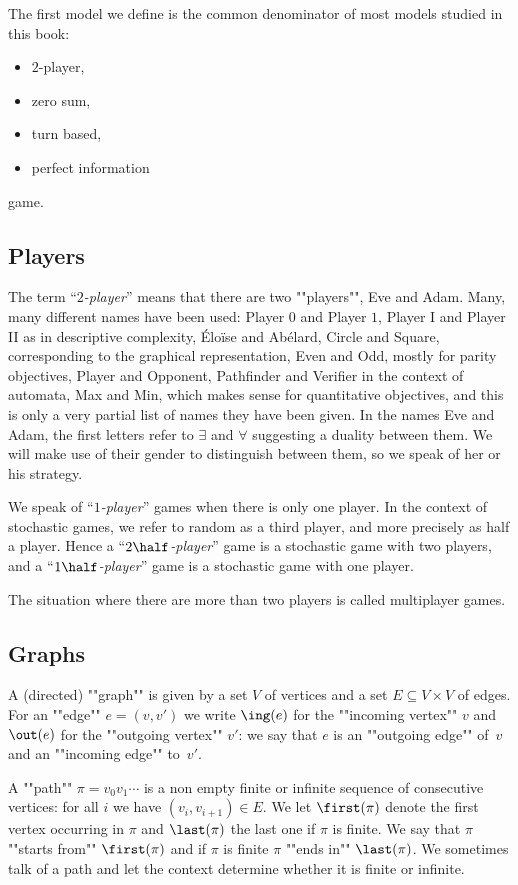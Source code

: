 The first model we define is the common denominator of most models studied in this book:
\begin{itemize}
	\item $2$-player,
	\item zero sum,
	\item turn based,
	\item perfect information
\end{itemize}
game.

\subsection*{Players}
The term ``\textit{$2$-player}'' means that there are two ""players"", Eve and Adam.
Many, many different names have been used: Player $0$ and Player $1$, 
Player I and Player II as in descriptive complexity,
{\'E}lo{\"i}se and Ab{\'e}lard, Circle and Square, corresponding to the graphical representation, 
Even and Odd, mostly for parity objectives, Player and Opponent, Pathfinder and Verifier in the context of automata,
Max and Min, which makes sense for quantitative objectives,
and this is only a very partial list of names they have been given.
In the names Eve and Adam, the first letters refer to $\exists$ and $\forall$ suggesting a duality between them.
We will make use of their gender to distinguish between them, so we speak of her or his strategy.

We speak of ``\textit{$1$-player}'' games when there is only one player.
In the context of stochastic games, we refer to random as a third player, and more precisely as half a player.
Hence a ``\textit{$2\half$-player}'' game is a stochastic game with two players,
and a ``\textit{$1\half$-player}'' game is a stochastic game with one player.

The situation where there are more than two players is called multiplayer games.

\subsection*{Graphs}
A (directed) ""graph"" is given by a set $V$ of vertices and a set $E \subseteq V \times V$ of edges.
For an ""edge"" $e = (v,v')$ we write $\ing(e)$ for the ""incoming vertex"" $v$ and 
$\out(e)$ for the ""outgoing vertex"" $v'$:
we say that $e$ is an ""outgoing edge"" of~$v$ and an ""incoming edge"" to~$v'$.

A ""path"" $\pi = v_0 v_1 \cdots$ is a non empty finite or infinite sequence of consecutive vertices: 
for all $i$ we have $(v_i,v_{i+1}) \in E$.
We let $\first(\pi)$ denote the first vertex occurring in $\pi$ and $\last(\pi)$ the last one if $\pi$ is finite.
We say that $\pi$ ""starts from"" $\first(\pi)$ and if $\pi$ is finite $\pi$ ""ends in"" $\last(\pi)$.
We sometimes talk of a path and let the context determine whether it is finite or infinite.


